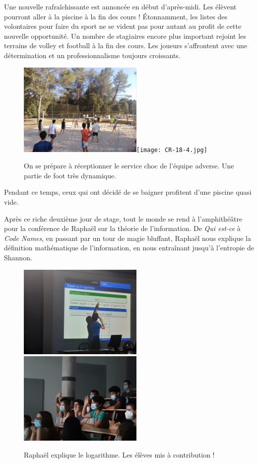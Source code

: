 Une nouvelle rafraîchissante est annoncée en début d’après-midi. Les élèvent pourront aller à la piscine à la fin des cours ! Étonnamment, les listes des volontaires pour faire du sport ne se vident pas pour autant au profit de cette nouvelle opportunité. Un nombre de stagiaires encore plus important rejoint les terrains de volley et football à la fin des cours. Les joueurs s’affrontent avec une détermination et un professionnalisme toujours croissants.

\begin{figure}[H]
\centering\includegraphics[width=6cm]{CR-18-2.jpg}\hspace{2cm}\texttt{[image: CR-18-4.jpg]}
\caption{On se prépare à réceptionner le service choc de l’équipe adverse. Une partie de foot très dynamique.}
\end{figure}

Pendant ce temps, ceux qui ont décidé de se baigner profitent d’une piscine quasi vide.

Après ce riche deuxième jour de stage, tout le monde se rend à l’amphithéâtre pour la conférence de Raphaël sur la théorie de l’information. De \textit{Qui est-ce} à \textit{Code Names}, en passant par un tour de magie bluffant, Raphaël nous explique la définition mathématique de l’information, en nous entraînant jusqu’à l’entropie de Shannon.

\begin{figure}[H]
\centering\includegraphics[width=6cm]{CR-18-5.jpg}\hspace{2cm}\includegraphics[width=6cm]{CR-18-6.jpg}
\caption{Raphaël explique le logarithme. Les élèves mis à contribution !}
\end{figure}

